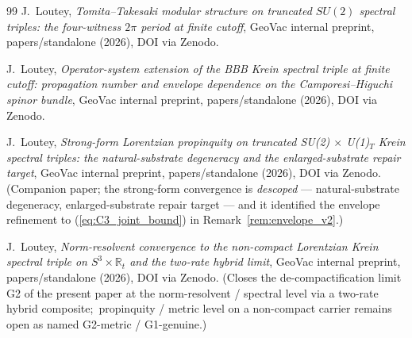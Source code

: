\documentclass[11pt,a4paper]{article}
\theoremstyle{plain}
\theoremstyle{definition}
\newcommand{\sthree}{S^{3}}
\newcommand{\R}{\mathbb{R}}
\begin{document}
\begin{thebibliography}{99}
J.~Loutey,
\newblock \emph{Tomita--Takesaki modular structure on truncated
$SU(2)$ spectral triples: the four-witness $2\pi$ period at finite
cutoff},
\newblock GeoVac internal preprint, papers/standalone (2026),
DOI via Zenodo.

J.~Loutey,
\newblock \emph{Operator-system extension of the BBB Krein spectral
triple at finite cutoff: propagation number and envelope dependence
on the Camporesi--Higuchi spinor bundle},
\newblock GeoVac internal preprint, papers/standalone (2026),
DOI via Zenodo.

J.~Loutey,
\newblock \emph{Strong-form Lorentzian propinquity on truncated
SU(2) $\times$ U(1)$_{T}$ Krein spectral triples: the natural-substrate
degeneracy and the enlarged-substrate repair target},
\newblock GeoVac internal preprint, papers/standalone (2026),
DOI via Zenodo. (Companion paper; the strong-form convergence is
\emph{descoped} --- natural-substrate degeneracy, enlarged-substrate
repair target --- and it identified the envelope
refinement to (\ref{eq:C3_joint_bound}) in
Remark~\ref{rem:envelope_v2}.)

J.~Loutey,
\newblock \emph{Norm-resolvent convergence to the non-compact
Lorentzian Krein spectral triple on $\sthree\times\R_{t}$ and the
two-rate hybrid limit},
\newblock GeoVac internal preprint, papers/standalone (2026),
DOI via Zenodo. (Closes the de-compactification limit G2 of the
present paper at the norm-resolvent / spectral level via a two-rate
hybrid composite;\ propinquity / metric level on a non-compact carrier
remains open as named G2-metric / G1-genuine.)

\end{thebibliography}
\end{document}
